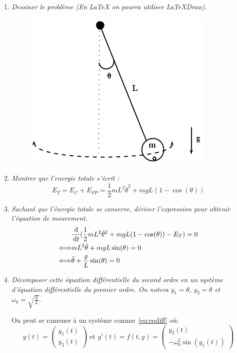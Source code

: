 \documentclass[a4paper,10pt]{article}
\begin{document}
\begin{enumerate}
    \item \emph{Dessiner le problème (En LaTeX on pourra utiliser LaTeXDraw).}
\begin{figure}[h!]
    \centering
    \includegraphics[scale=0.4]{./img/pendulum.png}
\end{figure}

    \item \emph{Montrer que l'energie totale s'écrit :}
\[
    E_T = E_C + E_{PP} = \frac{1}{2} m L^2 \dot{\theta}^2 + m g L (1 - \cos(\theta))
\]

    \item \emph{Sachant que l'énergie totale se conserve, dériver l'expression pour
    obtenir l'équation de mouvement.}
\begin{align*}
    & \frac{\,\mathrm{d}}{\,\mathrm{d} t} (\frac{1}{2} m L^2 \dot{\theta}^2 + m g L (1 -
    \cos(\theta)) - E_T) = 0\\
    \Longleftrightarrow & m L^2 \ddot{\theta} + m g L \sin(\theta) = 0\\
    \Longleftrightarrow & \ddot{\theta} + \frac{g}{L} \sin(\theta) = 0
\end{align*}

    \item \emph{Décomposer cette équation différentielle du second ordre en un système
    d'équation différentielle du premier ordre. On notera $y_1 = \theta$,
    $y_2 = \dot{\theta}$ et $\omega_0 = \sqrt{\frac{g}{L}}$.}

    On peut se ramener à un système comme~\eqref{eq:eqdiff} où:
\[
    y(t) = \left(\!
    \begin{array}{c}
        y_1(t) \\
        y_2(t)
    \end{array}
  \!\right) \text{ et }
  y'(t) = f(t, y) = \left(\!
    \begin{array}{c}
        y_2(t)\\
        -\omega_0^2 \sin(y_1(t))
    \end{array}
  \!\right)
\]


\end{enumerate}
\end{document}
